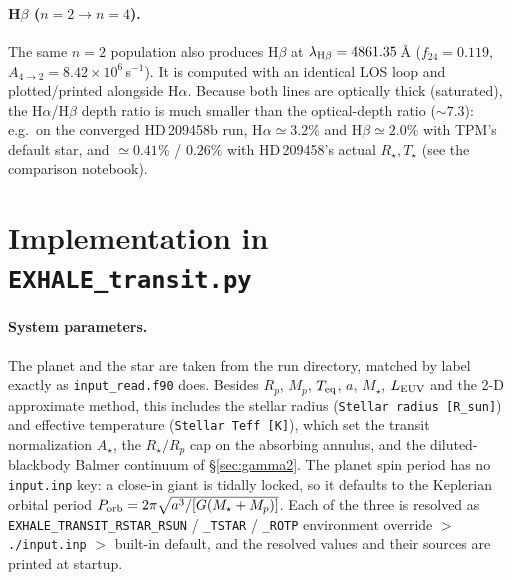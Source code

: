 \documentclass[english,a4paper]{my_memo}
\begin{document}
\paragraph{H$\beta$ ($n=2\to n=4$).} The same $n=2$ population also
produces H$\beta$ at $\lambda_{\rm H\beta}=4861.35\,$\AA{} ($f_{24}=0.119$,
$A_{4\to2}=8.42\times10^{6}\,$s$^{-1}$). It is computed with an identical
LOS loop and plotted/printed alongside H$\alpha$. Because both lines are
optically thick (saturated), the H$\alpha$/H$\beta$ depth ratio is much
smaller than the optical-depth ratio ($\sim7.3$): e.g.\ on the converged
HD\,209458b run, H$\alpha\simeq3.2\%$ and H$\beta\simeq2.0\%$ with TPM's
default star, and $\simeq0.41\%$ / $0.26\%$ with HD\,209458's actual
$R_\star,T_\star$ (see the comparison notebook).

\section{Implementation in \texttt{EXHALE\_transit.py}}

\paragraph{System parameters.} The planet and the star are taken from the run
directory, matched by label exactly as \texttt{input\_read.f90} does. Besides
$R_p$, $M_p$, $T_{\rm eq}$, $a$,
$M_\star$, $L_{\rm EUV}$ and the 2-D approximate method, this includes the
stellar radius (\texttt{Stellar radius [R\_sun]}) and effective temperature
(\texttt{Stellar Teff [K]}), which set the transit normalization $A_\star$,
the $R_\star/R_p$ cap on the absorbing annulus, and the diluted-blackbody
Balmer continuum of \S\ref{sec:gamma2}. The planet spin period has no
\texttt{input.inp} key: a close-in giant is tidally locked, so it defaults to
the Keplerian orbital period $P_{\rm orb}=2\pi\sqrt{a^3/[G(M_\star+M_p)]}$.
Each of the three is resolved as \texttt{EXHALE\_TRANSIT\_RSTAR\_RSUN} /
\texttt{\_TSTAR} / \texttt{\_ROTP} environment override $>$
\texttt{./input.inp} $>$ built-in default, and the resolved values and their
sources are printed at startup.
\end{document}
